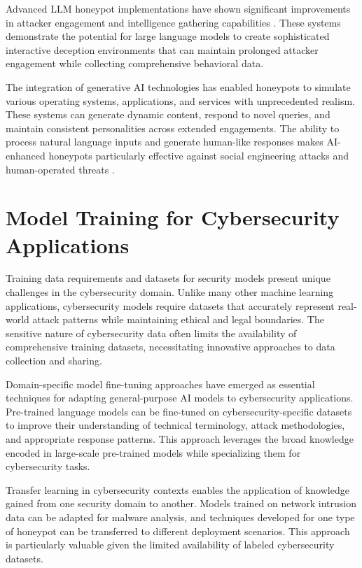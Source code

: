 Advanced LLM honeypot implementations have shown significant improvements in attacker engagement and intelligence gathering capabilities \cite{Otal2024,reworr2024}. These systems demonstrate the potential for large language models to create sophisticated interactive deception environments that can maintain prolonged attacker engagement while collecting comprehensive behavioral data.

The integration of generative AI technologies has enabled honeypots to simulate various operating systems, applications, and services with unprecedented realism. These systems can generate dynamic content, respond to novel queries, and maintain consistent personalities across extended engagements. The ability to process natural language inputs and generate human-like responses makes AI-enhanced honeypots particularly effective against social engineering attacks and human-operated threats \cite{christli2024}.

\section{Model Training for Cybersecurity Applications}

Training data requirements and datasets for security models present unique challenges in the cybersecurity domain. Unlike many other machine learning applications, cybersecurity models require datasets that accurately represent real-world attack patterns while maintaining ethical and legal boundaries. The sensitive nature of cybersecurity data often limits the availability of comprehensive training datasets, necessitating innovative approaches to data collection and sharing.

Domain-specific model fine-tuning approaches have emerged as essential techniques for adapting general-purpose AI models to cybersecurity applications. Pre-trained language models can be fine-tuned on cybersecurity-specific datasets to improve their understanding of technical terminology, attack methodologies, and appropriate response patterns. This approach leverages the broad knowledge encoded in large-scale pre-trained models while specializing them for cybersecurity tasks.

Transfer learning in cybersecurity contexts enables the application of knowledge gained from one security domain to another. Models trained on network intrusion data can be adapted for malware analysis, and techniques developed for one type of honeypot can be transferred to different deployment scenarios. This approach is particularly valuable given the limited availability of labeled cybersecurity datasets.

